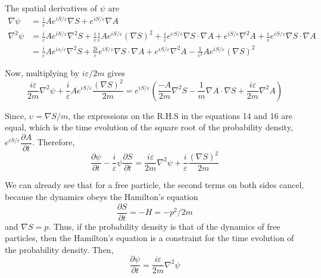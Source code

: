 The spatial derivatives of $\psi$ are
\begin{align*}
\nabla \psi & = \frac{i}{\varepsilon} Ae^{iS/\varepsilon} \nabla S + e^{iS/\varepsilon} \nabla A\\
\nabla^2 \psi & = \frac{i}{\varepsilon} Ae^{iS/ \varepsilon} \nabla^2 S + \frac{i}{\varepsilon} \frac{i}{\varepsilon} Ae^{iS/ \varepsilon} (\nabla S)^2 + \frac{i}{\varepsilon} e^{eS/\varepsilon} \nabla S \cdot \nabla A + e^{i S /\varepsilon} \nabla^2 A + \frac{i}{\varepsilon} e^{iS/\varepsilon } \nabla S \cdot \nabla A \\
& = \frac{i}{\varepsilon} Ae^{is/\varepsilon} \nabla^2 S + \frac{2i}{\varepsilon} e^{iS/\varepsilon} \nabla S \cdot \nabla A + e^{i S/\varepsilon} \nabla^2 A - \frac{1}{\varepsilon^2} A e^{iS/\varepsilon} (\nabla S)^2 \tag{15}
\end{align*}

Now, multiplying by $i\varepsilon /2m$ gives
\begin{equation*}
\frac{i\varepsilon}{2m} \nabla^2 \psi + \frac{i}{\varepsilon} A e^{iS/\varepsilon} \frac{(\nabla S)^2}{2m} = e^{iS/\varepsilon} \left(\frac{-A}{2m} \nabla^2 S - \frac{1}{m} \nabla A \cdot \nabla S + \frac{i\varepsilon}{2m} \nabla^2 A \right) \tag{16}
\end{equation*}

Since, $\upsilon = \nabla S/m$, the expressions on the R.H.S in the equations 14 and 16 are equal,
which is the time evolution of the square root of the probability density, $e^{iS/ \varepsilon} \dfrac{\partial A}{\partial t}$. Therefore,
\begin{equation*}
\frac{\partial \psi}{\partial t} - \frac{i}{\varepsilon} \psi \frac{\partial S}{\partial t} = \frac{i\varepsilon}{2m} \nabla^2 \psi + \frac{i}{\varepsilon} \frac{(\nabla S)^2}{2m} \tag{17}
\end{equation*}

We can already see that for a free particle, the second terms on both sides cancel, because
the dynamics obeys the Hamilton's equation
\begin{equation*}
\frac{\partial S}{\partial t} = -H = -p^2 / 2m \tag{18}
\end{equation*}
and $\nabla S = p$. Thus, if the probability density is that of the dynamics of free particles, then
the Hamilton's equation is a constraint for the time evolution of the probability density.
Then,
\begin{equation*}
\frac{\partial\psi}{\partial t} = \frac{i\varepsilon}{2m} \nabla^2 \psi \tag{19}
\end{equation*}

